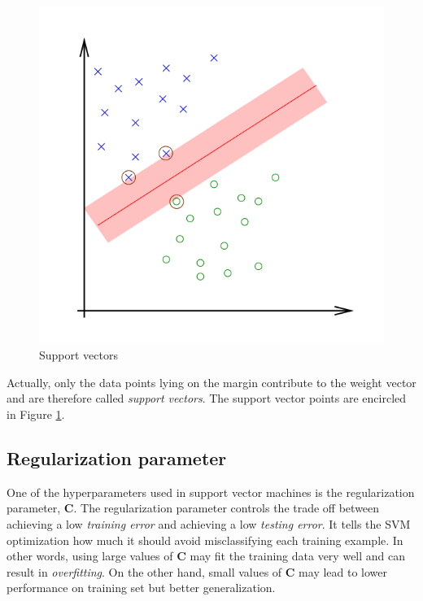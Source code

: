 \begin{figure}
\centering
\includegraphics[scale=0.4]{figures/SVMFigure3.png}
\caption{Support vectors}\label{fig:SVM3} %
\end{figure}

Actually, only the data points lying on the margin contribute to the weight vector and are therefore called \emph{support vectors}. The support vector points are encircled in Figure \ref{fig:SVM3}.

\subsection{Regularization parameter} \label{subsec:RegPar}


One of the hyperparameters used in support vector machines is the regularization parameter, $\mathbf{C}$. The regularization parameter controls the trade off between achieving a low \emph{training error} and achieving a low \emph{testing error}. It tells the SVM optimization how much it should avoid misclassifying each training example. In other words, using large values of $\mathbf{C}$ may fit the training data very well and can result in \emph{overfitting}. On the other hand, small values of $\mathbf{C}$ may lead to lower performance on training set but better generalization.
